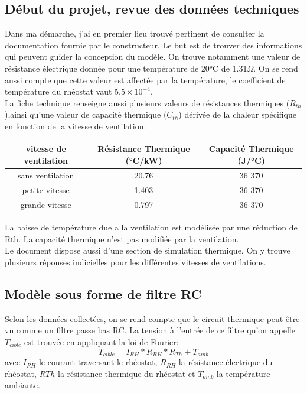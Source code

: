 \documentclass[a4paper]{report}
\begin{document}
	\subsection{Début du projet, revue des données techniques}
	Dans ma démarche, j'ai en premier lieu trouvé pertinent de consulter la documentation fournie par le constructeur. Le but est de trouver des informations qui peuvent guider la conception du modèle. On trouve notamment une valeur de résistance électrique donnée pour une température de 20°C de 1.31$\Omega$. On se rend aussi compte que cette valeur est affectée par la température, le coefficient de température du rhéostat vaut $5.5\times10^{-4}$.\\
	
	La fiche technique renseigne aussi plusieurs valeurs de résistances thermiques ($R_{th}$),ainsi qu'une valeur de capacité thermique ($C_{th}$) dérivée de la chaleur spécifique en fonction de la vitesse de ventilation: 
	
	\begin{center}
		\begin{tabular}{|c|c|c|}
			\hline
			vitesse de ventilation & Résistance Thermique (°C/kW) & Capacité Thermique (J/°C) \\
			\hline
			sans ventilation       & 20.76                        & 36 370                    \\
			\hline
			petite vitesse         & 1.403                        & 36 370                    \\
			\hline
			grande vitesse         & 0.797                        & 36 370                    \\
			\hline
		\end{tabular}
	\end{center}
	
	La baisse de température due a la ventilation est modélisée par une réduction de Rth. La capacité thermique n'est pas modifiée par la ventilation.\\ %
	Le document dispose aussi d'une section de simulation thermique. On y trouve plusieurs réponses indicielles pour les différentes vitesses de ventilations.

	\subsection{Modèle sous forme de filtre RC}
	Selon les données collectées, on se rend compte que le circuit thermique peut être vu comme un filtre passe bas RC. La tension à l'entrée de ce filtre qu'on appelle \textbf{$T_{cible}$} est trouvée en appliquant la loi de Fourier:
	\begin{equation}
	T_{cible} = I_{RH} * R_{RH} * R_{Th} + T_{amb}
	\end{equation}
	avec $I_{RH}$ le courant traversant le rhéostat, $R_{RH}$ la résistance électrique du rhéostat, $R{Th}$ la résistance thermique du rhéostat et $T_{amb}$ la température ambiante.\\
	
\end{document}
